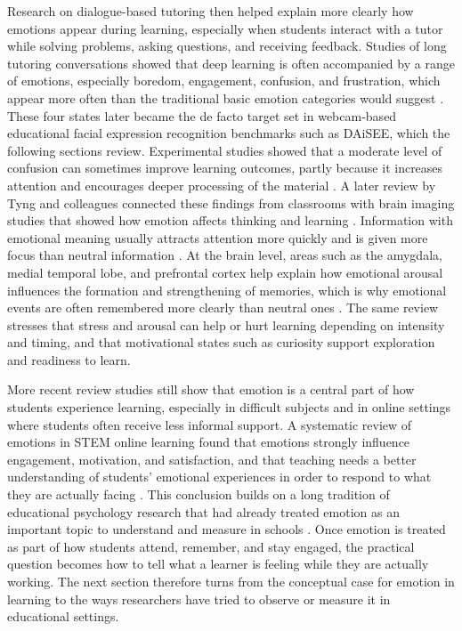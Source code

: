 Research on dialogue-based tutoring then helped explain more clearly how emotions appear during learning, especially when students interact with a tutor while solving problems, asking questions, and receiving feedback. Studies of long tutoring conversations showed that deep learning is often accompanied by a range of emotions, especially boredom, engagement, confusion, and frustration, which appear more often than the traditional basic emotion categories would suggest \cite{dmello_language_2012}. These four states later became the de facto target set in webcam-based educational facial expression recognition benchmarks such as DAiSEE, which the following sections review. Experimental studies showed that a moderate level of confusion can sometimes improve learning outcomes, partly because it increases attention and encourages deeper processing of the material \cite{dmello2014confusionbeneficial}. A later review by Tyng and colleagues connected these findings from classrooms with brain imaging studies that showed how emotion affects thinking and learning \cite{tyng_influences_2017}. Information with emotional meaning usually attracts attention more quickly and is given more focus than neutral information \cite{schupp2007selective,vuilleumier2005brainsbeware}. At the brain level, areas such as the amygdala, medial temporal lobe, and prefrontal cortex help explain how emotional arousal influences the formation and strengthening of memories, which is why emotional events are often remembered more clearly than neutral ones \cite{tyng_influences_2017,sharot2004emotionremembering}. The same review stresses that stress and arousal can help or hurt learning depending on intensity and timing, and that motivational states such as curiosity support exploration and readiness to learn.

More recent review studies still show that emotion is a central part of how students experience learning, especially in difficult subjects and in online settings where students often receive less informal support. A systematic review of emotions in STEM online learning found that emotions strongly influence engagement, motivation, and satisfaction, and that teaching needs a better understanding of students' emotional experiences in order to respond to what they are actually facing \cite{anwar_emotions_2023}. This conclusion builds on a long tradition of educational psychology research that had already treated emotion as an important topic to understand and measure in schools \cite{schutz2007emotioneducation}. Once emotion is treated as part of how students attend, remember, and stay engaged, the practical question becomes how to tell what a learner is feeling while they are actually working. The next section therefore turns from the conceptual case for emotion in learning to the ways researchers have tried to observe or measure it in educational settings.


